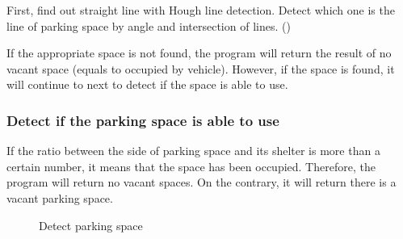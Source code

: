 \documentclass[runningheads,a4paper]{llncs}
\begin{document}
First, find out straight line with Hough line detection. Detect
which one is the line of parking space by angle and intersection of
lines. ()

If the appropriate space is not found, the program will return the
result of no vacant space (equals to occupied by vehicle). However, if
the space is found, it will continue to next to detect if the space is
able to use.

\subsubsection{Detect if the parking space is able to use}

If the ratio between the side of parking space and its shelter is more
than a certain number, it means that the space has been occupied.
Therefore, the program will return no vacant spaces. On the contrary, 
it will return there is a vacant parking space.

\begin{figure}[tbp]
	\hspace{0.5in}
	\caption{Detect parking space}
	\label{detectingParkingspace}
\end{figure}
\end{document}
